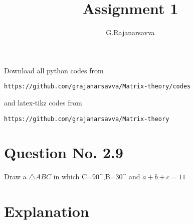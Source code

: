 \documentclass[journal,12pt,twocolumn]{IEEEtran}
\begin{document}
     \def\rightbox#1{\makebox[0in][r]{#1}}
     \def\centbox#1{\makebox[0in]{#1}}
     \def\topbox#1{\raisebox{-\baselineskip}[0in][0in]{#1}}
     \def\midbox#1{\raisebox{-0.5\baselineskip}[0in][0in]{#1}}
\vspace{3cm}
\title{Assignment 1}
\author{G.Rajanarsavva}
\maketitle
\newpage
\bigskip
\renewcommand{\thefigure}{\theenumi}
\renewcommand{\thetable}{\theenumi}
Download all python codes from 
\begin{lstlisting}
https://github.com/grajanarsavva/Matrix-theory/codes
\end{lstlisting}
%
and latex-tikz codes from 
%
\begin{lstlisting}
https://github.com/grajanarsavva/Matrix-theory
\end{lstlisting}
%
\section{Question No. 2.9}
\item Draw a $\triangle ABC$ in which \angle C=90^{\degree},\angle B=30^{\degree} and $a+b+c=11$

\section{Explanation}
\end{document}
